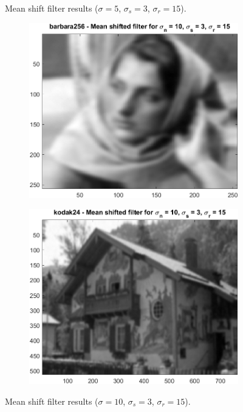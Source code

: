 \documentclass{article}
\begin{document}
\begin{figure}[H]
\begin{subfigure}[b]{0.45\textwidth}
    \end{subfigure}
    \caption{Mean shift filter results ($\sigma = 5$, $\sigma_s = 3$, $\sigma_r = 15$).}
\end{figure}

\begin{figure}[H]
    \centering
    \begin{subfigure}[b]{0.45\textwidth}
        \includegraphics[width=\textwidth]{../images/barbara_10_3_15.png}
    \end{subfigure}
    \begin{subfigure}[b]{0.45\textwidth}
        \includegraphics[width=\textwidth]{../images/kodak_10_3_15.png}
    \end{subfigure}
    \caption{Mean shift filter results ($\sigma = 10$, $\sigma_s = 3$, $\sigma_r = 15$).}
\end{figure}
\end{document}
